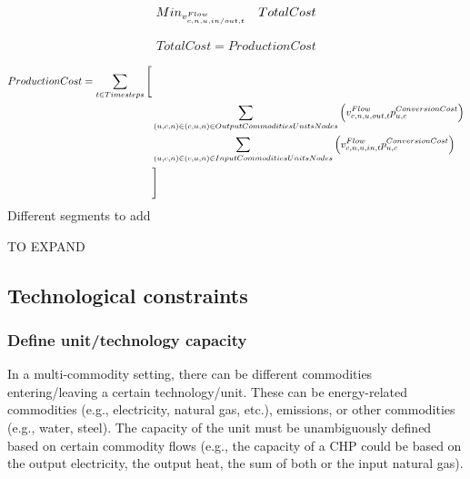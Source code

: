 \begin{align} \label{eq:objective}
Min_{\vFlow} \quad  TotalCost
\end{align}

\begin{align} \label{eq:objective_definition}
TotalCost = ProductionCost
\end{align}


\begin{align} \label{eq:production_cost}
ProductionCost = \sum_{\timesteps} \Bigg[& \nonumber \\
& \sum_{(\unit, \commodity, \node) \in \OutputCommoditiesUnitsNodes} \Big(\vFlow[\commodity, \node, \unit, out, \timestep] \pConversionCost \Big) \nonumber \\
& \sum_{(\unit, \commodity, \node) \in \InputCommoditiesUnitsNodes} \Big(\vFlow[\commodity, \node, \unit, in, \timestep]\pConversionCost \Big) \nonumber \\
& \Bigg]
\end{align}
{\color{red} Different segments to add}



{\color{red} TO EXPAND}






\subsection{Technological constraints}

\subsubsection{Define unit/technology capacity}

In a multi-commodity setting, there can be different commodities entering/leaving a certain technology/unit. These can be energy-related commodities (e.g., electricity, natural gas, etc.), emissions, or other commodities (e.g., water, steel). The capacity of the unit must be unambiguously defined based on certain commodity flows (e.g., the capacity of a CHP could be based on the output electricity, the output heat, the sum of both or the input natural gas). 

